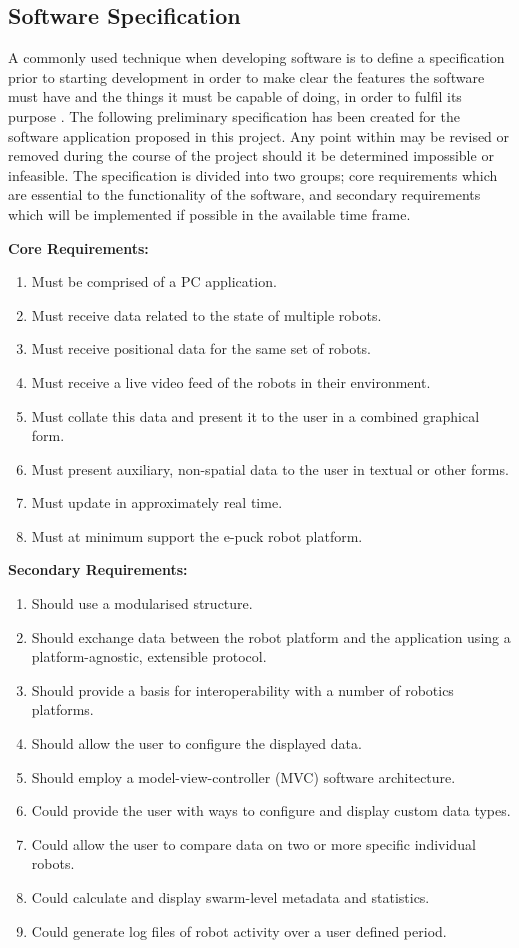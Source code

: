 \documentclass[hidelinks,10pt]{article}
\begin{document}
\subsection{Software Specification}
A commonly used technique when developing software is to define a specification prior to starting development in order to make clear the features the software must have and the things it must be capable of doing, in order to fulfil its purpose \cite{NASAApproach}. The following preliminary specification has been created for the software application proposed in this project. Any point within may be revised or removed during the course of the project should it be determined impossible or infeasible. The specification is divided into two groups; core requirements which are essential to the functionality of the software, and secondary requirements which will be implemented if possible in the available time frame.

\noindent \textbf{Core Requirements:}
\begin{enumerate}
	\item Must be comprised of a PC application.
	\item Must receive data related to the state of multiple robots.
	\item Must receive positional data for the same set of robots.
	\item Must receive a live video feed of the robots in their environment.
	\item Must collate this data and present it to the user in a combined graphical form.
	\item Must present auxiliary, non-spatial data to the user in textual or other forms.
	\item Must update in approximately real time.
	\item Must at minimum support the e-puck robot platform.
\end{enumerate}

\noindent \textbf{Secondary Requirements:}
\begin{enumerate}
	\item Should use a modularised structure.
	\item Should exchange data between the robot platform and the application using a platform-agnostic, extensible protocol.
	\item Should provide a basis for interoperability with a number of robotics platforms.
	\item Should allow the user to configure the displayed data.
	\item Should employ a model-view-controller (MVC) software architecture.
	\item Could provide the user with ways to configure and display custom data types.
	\item Could allow the user to compare data on two or more specific individual robots.
	\item Could calculate and display swarm-level metadata and statistics.
	\item Could generate log files of robot activity over a user defined period.
\end{enumerate}
\end{document}
